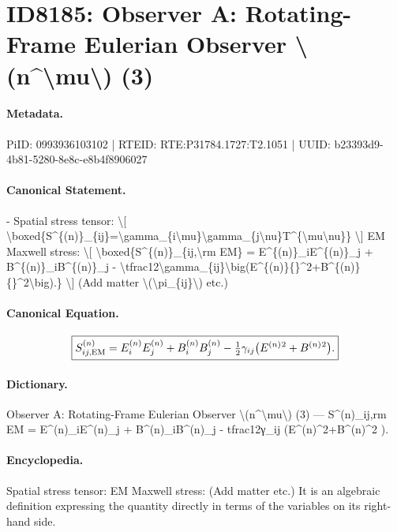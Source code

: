 \section*{ID8185: Observer A: Rotating-Frame Eulerian Observer \textbackslash{}(n\textasciicircum{}\textbackslash{}mu\textbackslash{}) (3)}
\paragraph{Metadata.}
PiID: 0993936103102 | RTEID: RTE:P31784.1727:T2.1051 | UUID: b23393d9-4b81-5280-8e8c-e8b4f8906027

\paragraph{Canonical Statement.}
- Spatial stress tensor: \textbackslash{}[ \textbackslash{}boxed\{S\textasciicircum{}\{(n)\}\_\{ij\}=\textbackslash{}gamma\_\{i\textbackslash{}mu\}\textbackslash{}gamma\_\{j\textbackslash{}nu\}T\textasciicircum{}\{\textbackslash{}mu\textbackslash{}nu\}\} \textbackslash{}] EM Maxwell stress: \textbackslash{}[ \textbackslash{}boxed\{S\textasciicircum{}\{(n)\}\_\{ij,\textbackslash{}rm EM\} = E\textasciicircum{}\{(n)\}\_iE\textasciicircum{}\{(n)\}\_j + B\textasciicircum{}\{(n)\}\_iB\textasciicircum{}\{(n)\}\_j - \textbackslash{}tfrac12\textbackslash{}gamma\_\{ij\}\textbackslash{}big(E\textasciicircum{}\{(n)\}\{\}\textasciicircum{}2+B\textasciicircum{}\{(n)\}\{\}\textasciicircum{}2\textbackslash{}big).\} \textbackslash{}] (Add matter \textbackslash{}(\textbackslash{}pi\_\{ij\}\textbackslash{}) etc.)

\paragraph{Canonical Equation.}
\[
\boxed{S^{(n)}_{ij,\rm EM} = E^{(n)}_iE^{(n)}_j + B^{(n)}_iB^{(n)}_j - \tfrac12\gamma_{ij}\big(E^{(n)}{}^2+B^{(n)}{}^2\big).}
\]

\paragraph{Dictionary.}
Observer A: Rotating-Frame Eulerian Observer \textbackslash{}(n\textasciicircum{}\textbackslash{}mu\textbackslash{}) (3) — S\textasciicircum{}(n)\_ij,rm EM = E\textasciicircum{}(n)\_iE\textasciicircum{}(n)\_j + B\textasciicircum{}(n)\_iB\textasciicircum{}(n)\_j - tfrac12γ\_ij (E\textasciicircum{}(n)\textasciicircum{}2+B\textasciicircum{}(n)\textasciicircum{}2 ).

\paragraph{Encyclopedia.}
Spatial stress tensor: EM Maxwell stress: (Add matter etc.) It is an algebraic definition expressing the quantity directly in terms of the variables on its right-hand side.
